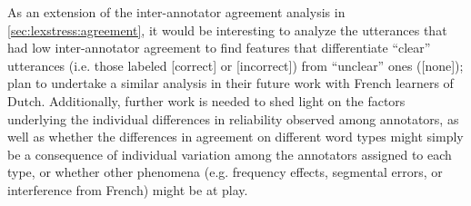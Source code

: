 
As an extension of the inter-annotator agreement analysis in \cref{sec:lexstress:agreement}, it would be interesting to analyze the utterances that had low inter-annotator agreement 
	to find features that differentiate ``clear'' utterances (i.e. those labeled [correct] or [incorrect]) from ``unclear'' ones ([none]); \textcite{Michaux2013} plan to undertake a similar analysis in their future work with French learners of Dutch. Additionally, further work is needed to shed light on the factors underlying the individual differences in reliability observed among annotators, as well as whether the differences in agreement on different word types might simply be a consequence of individual variation among the annotators assigned to each type, or whether other phenomena (e.g. frequency effects, segmental errors, or interference from French) might be at play.





	




